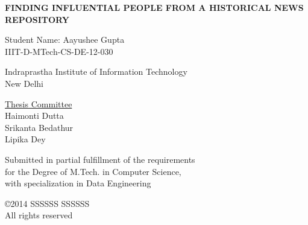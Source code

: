 

\def\addrone{Your address}
\def\addrtwo{Your city}

\def\degree{M.Tech. in Computer Science with Specialization in Data Engineering}


\def\submissiondate{June 01, 2014}

\def\supervisorone{Haimonti Dutta}

\def\supervisortwo{Srikanta Bedathur}

\def\supervisorthree{Lipika Dey}





\thispagestyle{empty}

\begin{center}

{\LARGE \bf {FINDING INFLUENTIAL PEOPLE FROM A HISTORICAL NEWS REPOSITORY }

 }  
 \vspace{.3in}
 
 {\Large{Student Name: Aayushee Gupta}} \\  
 \vspace{.1in} 
 IIIT-D-MTech-CS-DE-12-030 \\

  
    \vspace{.35in}

  \vspace{.25in}

{Indraprastha Institute of Information Technology\\
New Delhi}

\vspace{.35in}  {\underline{Thesis Committee} \\ \supervisorone         
   \\ \supervisortwo \\ \supervisorthree }\\ \vspace{.35in}


 {Submitted in partial fulfillment of the requirements \\for the Degree of M.Tech. in Computer Science, \\ with specialization in Data Engineering}

\vspace{.2in}

\copyright 2014 SSSSSS SSSSSS \\ All rights reserved \\
\vspace{.8in}


\end{center}
